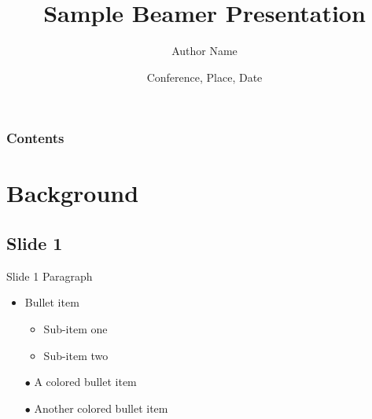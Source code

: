 \documentclass[compress,ignorenonframetext]{beamer}
\title{Sample Beamer Presentation}
\author{Author Name}
\institute{Company or Institute}
\date{Conference, Place, Date}
\begin{document}

\begin{frame}[plain]
\titlepage %
\addtocounter{framenumber}{-1}
\end{frame}

\begin{frame}
\frametitle{Contents}%
\tableofcontents%
\end{frame}

\section{Background}

\subsection{Slide 1}
\begin{frame}{Slide 1}
Paragraph
\begin{itemize}
\item Bullet item
	\begin{itemize}
	\item Sub-item one
	\item Sub-item two
	\end{itemize}
\item[\color{green} $\bullet$] A colored bullet item
\item[\color{red} $\bullet$] Another colored bullet item
\end{itemize}

\end{frame}
\end{document}
